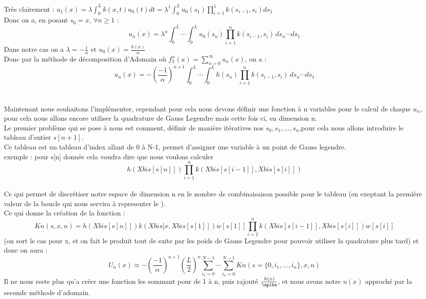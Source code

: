 \documentclass{article}
\begin{document}
Très clairement : $u_1(x)=\lambda\displaystyle\int_{0}^{L}k(x,t)u_0(t)dt=\lambda^{1} \displaystyle\int_{0}^{L} u_0(s_1)\prod_{i=1}^1 k(s_{i-1},s_i) ds_1 $\\
Donc on a, en posant $s_0=x$, $\forall n \geq 1$ :
$$u_{n}(x)= \lambda^n\displaystyle\int_{0}^{L}\cdots\displaystyle\int_{0}^{L} u_0(s_n)\prod_{i=1}^n k(s_{i-1},s_i)\,ds_n\cdots ds_1$$
Dans notre cas on a $\lambda = -\frac{1}{\alpha}$ et $u_0(x)=\frac{h(x)}{\alpha}$ \\
Donc par la méthode de décomposition d'Adomain où $f_3^\alpha(x)=\displaystyle\sum_{n=0}^{\infty}u_n(x)$, on a :
$$u_{n}(x)= -\left(\frac{-1}{\alpha}\right)^{n+1}\displaystyle\int_{0}^{L}\cdots\displaystyle\int_{0}^{L} h(s_n)\prod_{i=1}^n k(s_{i-1},s_i)\,ds_n\cdots ds_1$$
\\ \\
Maintenant nous souhaitons l'implémenter, cependant pour cela nous devons définir une fonction à n variables pour le calcul de chaque $u_n$, pour cela nous allons encore utiliser la quadrature de Gauss Legendre mais cette fois ci, en dimension n.\\
Le premier problème qui se pose à nous est comment, définir de manière itératives nos $s_0,s_1,...,s_n$,pour cela nous allons introduire le tableau d'entier $s[n+1]$. \\
Ce tableau est un tableau d'index allant de 0 à N-1, permet d'assigner une variable à un point de Gauss legendre.\\
exemple : pour s[n] donnée cela voudra dire que nous voulons calculer $$h(Xbis[s[n]])\prod_{i=1}^nk\left(Xbis[s[i-1]],Xbis[s[i]]\right)$$ \\
Ce qui permet de discrétiser notre espace de dimension n en le nombre de combinaisaison possible pour le tableau (en exeptant la première valeur de la boucle qui nous servira à representer le ).\\
Ce qui donne la création de la fonction :
$$Kn(s,x,n)=h(Xbis[s[n]])k\left(Xbis[x,Xbis[s[1]]\right)w[s[1]]\prod_{i=2}^n k\left(Xbis[s[i-1]],Xbis[s[i]]\right)w[s[i]] $$
(on sort le cas pour x, et on fait le produit tout de suite par les poids de Gauss Legendre pour pouvoir utiliser la quadrature plus tard)
et donc on aura :
$$U_n(x)\approx-\left(\frac{-1}{\alpha}\right)^{n+1}\left(\frac{L}{2}\right)^n\displaystyle\sum_{i_1=0}^{N-1}\cdots\displaystyle\sum_{i_n=0}^{N-1}Kn(s=\{0,i_1,...,i_n\},x,n)$$
Il ne nous reste plus qu'a créer une fonction les sommant pour de 1 à n, puis rajouté $\frac{h(x)}{\aplha}$, et nous avons notre $u(x)$ approché par la seconde méthode d'adomain.\\
\end{document}
